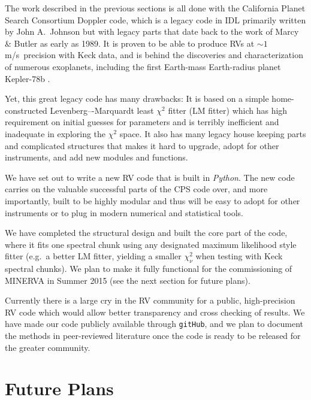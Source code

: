 \documentclass[12pt]{article}
\def\mps{m/s}
\begin{document}
The work described in the previous sections is all done with the
California Planet Search Consortium Doppler code, which is a legacy
code in IDL primarily written by John A.\ Johnson but with legacy
parts that date back to the work of Marcy \& Butler as early as
1989. It is proven to be able to produce RVs at $\sim 1$
\mps\ precision with Keck data, and is behind the discoveries and
characterization of numerous exoplanets, including the first
Earth-mass Earth-radius planet Kepler-78b \citep{howard2013,pepe2013}.

Yet, this great legacy code has many drawbacks: It is based on a
simple home-constructed Levenberg–-Marquardt least $\chi^2$ fitter
(LM fitter) which has high requirement on initial guesses for
parameters and is terribly inefficient and inadequate in exploring the
$\chi^2$ space. It also has many legacy house keeping parts and
complicated structures that makes it hard to upgrade, adopt for other
instruments, and add new modules and functions.

We have set out to write a new RV code that is built in {\it Python}.
The new code carries on the valuable successful parts of the CPS code
over, and more importantly, built to be highly modular and thus will
be easy to adopt for other instruments or to plug in modern
numerical and statistical tools.

We have completed the structural design and built the core part of the
code, where it fits one spectral chunk using any designated maximum
likelihood style fitter (e.g.\ a better LM fitter, yielding a smaller
$\chi^2_\nu$ when testing with Keck spectral chunks). We plan to make
it fully functional for the commissioning of MINERVA in
Summer 2015 (see the next section for future plans).

Currently there is a large cry in the RV community for a public,
high-precision RV code which would allow better transparency and cross
checking of results. We have made our code publicly available through
{\tt gitHub}, and we plan to document the methods in peer-reviewed
literature once the code is ready to be released for the greater
community.


\vspace{-10pt}
\section{Future Plans}
\vspace{-5pt}
\end{document}
